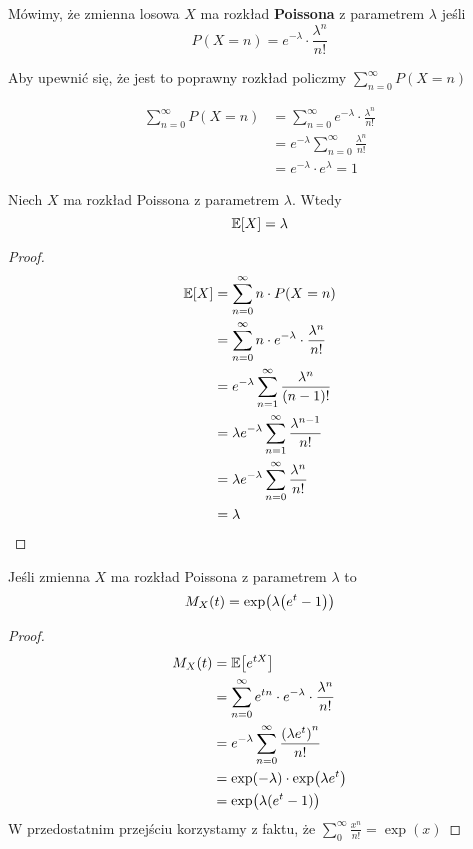 \begin{definition}
    Mówimy, że zmienna losowa \( X \) ma rozkład
    \textbf{Poissona} z parametrem \( \lambda \) jeśli
    \[
        P(X = n) = e^{-\lambda} \cdot \frac{\lambda^n}{n!}
    \]
\end{definition}

Aby upewnić się, że jest to poprawny rozkład policzmy \( \sum_{n = 0}^\infty P(X = n) \)

\begin{align*}
    \sum_{n = 0}^\infty P(X = n) 
        &= \sum_{n = 0}^\infty e^{-\lambda} \cdot \frac{\lambda^n}{n!} \\
        &= e^{-\lambda} \sum_{n=0}^\infty \frac{\lambda^n}{n!} \\
        &= e^{-\lambda} \cdot  e^\lambda = 1
\end{align*}

\begin{theorem}
    Niech \( X \) ma rozkład Poissona z parametrem \( \lambda \). Wtedy
    \[
        \expected{X} = \lambda
    \]
\end{theorem}
\begin{proof}
    \begin{align*}
         \expected{X} &= \sum_{n = 0}^\infty n \cdot P(X = n)  \\
            &= \sum_{n = 0}^\infty n \cdot e^{-\lambda} \cdot \frac{\lambda^n}{n!} \\
            &= e^{-\lambda} \sum_{n=1}^\infty \frac{\lambda^n}{(n-1)!} \\
            &= \lambda e^{-\lambda} \sum_{n=1}^\infty \frac{\lambda^{n-1}}{n!} \\
            &= \lambda e^{-\lambda} \sum_{n=0}^\infty \frac{\lambda^n}{n!} \\
            &= \lambda
    \end{align*}
\end{proof}

\begin{theorem}[Lemat 5.3 P\&C]
    Jeśli zmienna \( X \) ma rozkład Poissona z parametrem \( \lambda \) to
    \[
        M_X(t) = \exp\pars{\lambda\pars{e^t -  1}}
    \]
\end{theorem}
\begin{proof}
    \begin{align*}
        M_X(t) 
            &= \expected{e^{tX}} \\
            &= \sum_{n=0}^\infty e^{tn} \cdot e^{-\lambda} \cdot \frac{\lambda^n}{n!} \\
            &= e^{-\lambda} \sum_{n=0}^\infty \frac{\pars{\lambda e^t}^n}{n!} \\
            &= \exp(-\lambda) \cdot \exp\pars{\lambda e^t} \\
            & = \exp\pars{\lambda(e^t - 1)}
    \end{align*}
    W przedostatnim przejściu korzystamy z faktu, że \( \sum_{0}^\infty \frac{x^n}{n!} = \exp(x) \)
\end{proof}

